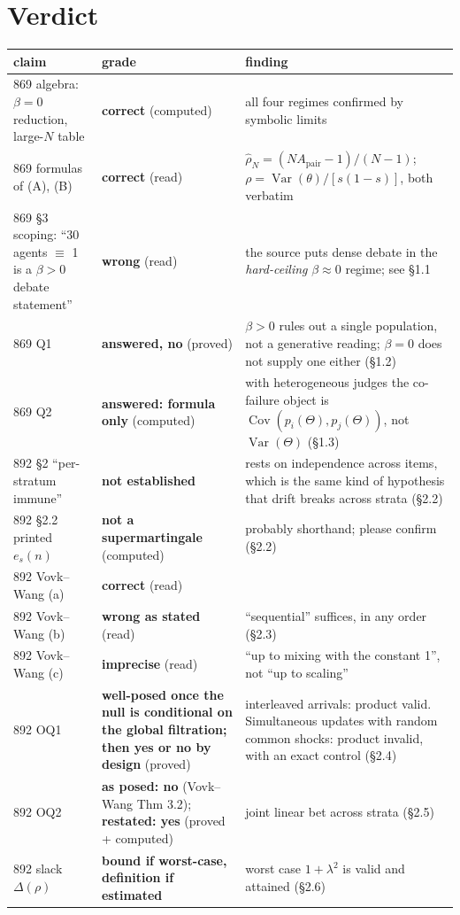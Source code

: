 \documentclass[11pt]{article}
\newcommand{\Var}{\operatorname{Var}}
\newcommand{\Cov}{\operatorname{Cov}}
\begin{document}
\section*{Verdict}
\begin{center}\small
\begin{tabular}{@{}p{5.0cm}p{2.6cm}p{8.4cm}@{}}
\toprule
claim & grade & finding\\\midrule
869 algebra: $\beta=0$ reduction, large-$N$ table & \textbf{correct} (computed) & all four regimes confirmed by symbolic limits\\
869 formulas of (A), (B) & \textbf{correct} (read) & $\hat\rho_N=(NA_{\mathrm{pair}}-1)/(N-1)$; $\rho=\Var(\theta)/[s(1-s)]$, both verbatim\\
869 \S3 scoping: ``30 agents $\equiv$ 1 is a $\beta>0$ debate statement'' & \textbf{wrong} (read) & the source puts dense debate in the \emph{hard-ceiling} $\beta\approx0$ regime; see \S1.1\\
869 Q1 & \textbf{answered, no} (proved) & $\beta>0$ rules out a single population, not a generative reading; $\beta=0$ does not supply one either (\S1.2)\\
869 Q2 & \textbf{answered: formula only} (computed) & with heterogeneous judges the co-failure object is $\Cov(p_i(\Theta),p_j(\Theta))$, not $\Var(\Theta)$ (\S1.3)\\
892 \S2 ``per-stratum immune'' & \textbf{not established} & rests on independence across items, which is the same kind of hypothesis that drift breaks across strata (\S2.2)\\
892 \S2.2 printed $e_s(n)$ & \textbf{not a supermartingale} (computed) & probably shorthand; please confirm (\S2.2)\\
892 Vovk--Wang (a) & \textbf{correct} (read) & \\
892 Vovk--Wang (b) & \textbf{wrong as stated} (read) & ``sequential'' suffices, in any order (\S2.3)\\
892 Vovk--Wang (c) & \textbf{imprecise} (read) & ``up to mixing with the constant 1'', not ``up to scaling''\\
892 OQ1 & \textbf{well-posed once the null is conditional on the global filtration; then yes or no by design} (proved) & interleaved arrivals: product valid. Simultaneous updates with random common shocks: product invalid, with an exact control (\S2.4)\\
892 OQ2 & \textbf{as posed: no} (Vovk--Wang Thm 3.2); \textbf{restated: yes} (proved + computed) & joint linear bet across strata (\S2.5)\\
892 slack $\Delta(\rho)$ & \textbf{bound if worst-case, definition if estimated} & worst case $1+\lambda^2$ is valid and attained (\S2.6)\\
\bottomrule
\end{tabular}
\end{center}
\end{document}
